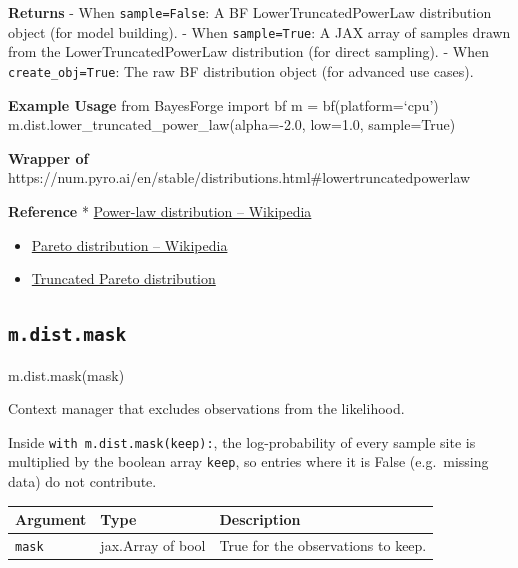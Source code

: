 \documentclass[
  letterpaper,
  DIV=11,
  numbers=noendperiod]{scrartcl}
\newenvironment{Shaded}{\begin{snugshade}}{\end{snugshade}}
\newcommand{\NormalTok}[1]{\textcolor[rgb]{0.00,0.23,0.31}{#1}}
\begin{document}
\textbf{Returns} - When \texttt{sample=False}: A BF
LowerTruncatedPowerLaw distribution object (for model building). - When
\texttt{sample=True}: A JAX array of samples drawn from the
LowerTruncatedPowerLaw distribution (for direct sampling). - When
\texttt{create\_obj=True}: The raw BF distribution object (for advanced
use cases).

\textbf{Example Usage} from BayesForge import bf m = bf(platform=`cpu')
m.dist.lower\_truncated\_power\_law(alpha=-2.0, low=1.0, sample=True)

\textbf{Wrapper of}
https://num.pyro.ai/en/stable/distributions.html\#lowertruncatedpowerlaw

\textbf{Reference} *
\href{https://en.wikipedia.org/wiki/Power_law\#Continuous_power-law_distribution}{Power-law
distribution -- Wikipedia}

\begin{itemize}
\item
  \href{https://en.wikipedia.org/wiki/Pareto_distribution}{Pareto
  distribution -- Wikipedia}
\item
  \href{https://arxiv.org/abs/0706.1062}{Truncated Pareto distribution}
\end{itemize}

\subsection{\texorpdfstring{\texttt{m.dist.mask}}{m.dist.mask}}\label{mask}

\begin{Shaded}
\begin{Highlighting}[]
\NormalTok{m.dist.mask(mask)}
\end{Highlighting}
\end{Shaded}

Context manager that excludes observations from the likelihood.

Inside \texttt{with\ m.dist.mask(keep):}, the log-probability of every
sample site is multiplied by the boolean array \texttt{keep}, so entries
where it is False (e.g.~missing data) do not contribute.

\begin{longtable}[]{@{}lll@{}}
\toprule\noalign{}
Argument & Type & Description \\
\midrule\noalign{}
\endhead
\bottomrule\noalign{}
\endlastfoot
\texttt{mask} & jax.Array of bool & True for the observations to
keep. \\
\end{longtable}
\end{document}
